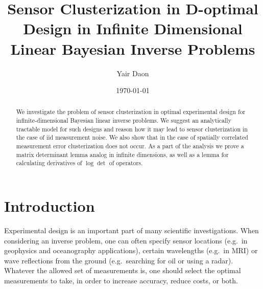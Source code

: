 \documentclass{amsart}
\numberwithin{equation}{section}
\begin{document}
\title[Sensor Clusterization in D-optimal design in infinite
  dimensions]{Sensor Clusterization in D-optimal Design in Infinite
  Dimensional Linear Bayesian Inverse Problems}

\author{Yair Daon}
\address{Porter School of the Environment and Earth
  Sciences, Tel Aviv University\\ Tel Aviv, Israel}

\date{\today}

\begin{abstract}
  We investigate the problem of sensor clusterization in optimal
  experimental design for infinite-dimensional Bayesian
  linear inverse problems. We suggest an analytically
  tractable model for such designs and reason how it may lead to
  sensor clusterization in the case of iid measurement noise. We also
  show that in the case of spatially correlated measurement error
  clusterization does not occur. As a part of the analysis we prove a
  matrix determinant lemma analog in infinite dimensions, as well as a
  lemma for calculating derivatives of $\log \det$ of operators.
\end{abstract}

\maketitle

\section{Introduction}\label{section:OED intro}
Experimental design is an important part of many scientific
investigations. When considering an inverse problem, one can often
specify sensor locations (e.g.\ in geophysics and oceanography
applications), certain wavelengths (e.g.\ in MRI) or wave reflections
from the ground (e.g.\ searching for oil or using a radar). Whatever
the allowed set of measurements is, one should select the optimal
measurements to take, in order to increase accuracy, reduce costs, or
both.
\end{document}
